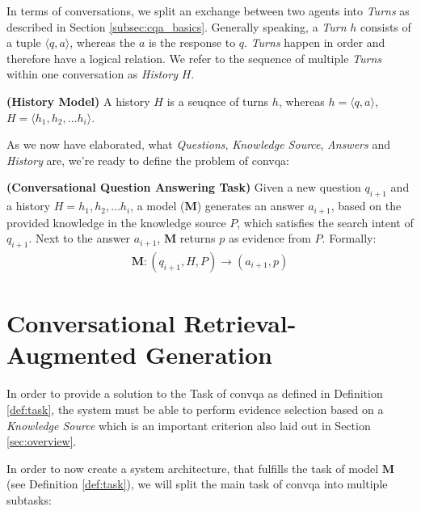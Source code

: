 In terms of conversations, we split an exchange between two agents into \textit{Turns} as described in Section \ref{subsec:cqa_basics}. Generally speaking, a \textit{Turn} $h$ consists of a tuple $\langle q,a\rangle$, whereas the $a$ is the response to $q$. \textit{Turns} happen in order and therefore have a logical relation. We refer to the sequence of multiple \textit{Turns} within one conversation as \textit{History} $H$.

\begin{definition}
    \textbf{(History Model)} A history $H$ is a seuqnce of turns $h$, whereas $h = \langle q,a\rangle$, $H = \langle h_1, h_2, \dots h_i\rangle$.
    \label{def:history_model}
\end{definition}

As we now have elaborated, what \textit{Questions}, \textit{Knowledge Source}, \textit{Answers} and \textit{History} are, we're ready to define the problem of \gls{convqa}:

\begin{definition}
    \textbf{(Conversational Question Answering Task)} Given a new question $q_{i+1}$ and a history $H = {h_1, h_2, \dots h_i}$, a model ($\mathbf{M}$) generates an answer $a_{i+1}$, based on the provided knowledge in the knowledge source $P$, which satisfies the search intent of $q_{i+1}$. Next to the answer $a_{i+1}$, $\mathbf{M}$ returns $p$ as evidence from $P$. Formally:
    \begin{align*}
        \mathbf{M}: (q_{i+1}, H, P) \rightarrow (a_{i+1}, p)
    \end{align*}
    \label{def:task}
\end{definition}

\section{Conversational Retrieval-Augmented Generation}
\label{sec:conrag}

In order to provide a solution to the Task of \gls{convqa} as defined in Definition \ref{def:task}, the system must be able to perform evidence selection based on a \textit{Knowledge Source} which is an important criterion also laid out in Section \ref{sec:overview}. 

In order to now create a system architecture, that fulfills the task of model $\mathbf{M}$ (see Definition \ref{def:task}), we will split the main task of \gls{convqa} into multiple subtasks:

